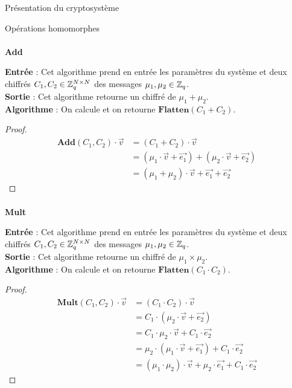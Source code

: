 \begin{section}{Présentation du cryptosystème}
\begin{subsection}{Opérations homomorphes}
	\paragraph{}
	\textbf{Add}
	\flushleft
	
	\textbf{Entrée} : Cet algorithme prend en entrée les paramètres du système et deux chiffrés $C_1, C_2 \in \mathbb{Z}_q^{N \times N}$ des messages $\mu_1, \mu_2 \in \mathbb{Z}_q$.\\
	\textbf{Sortie} : Cet algorithme retourne un chiffré de $\mu_1 + \mu_2$.\\
	\textbf{Algorithme} : On calcule et on retourne $\textbf{Flatten}(C_1 + C_2)$.
	\begin{proof}
	\begin{align*}
	\textbf{Add}(C_1, C_2) \cdot \vec{v} &= (C_1 + C_2) \cdot \vec{v} \\
	&= (\mu_1 \cdot \vec{v} + \vec{e_1}) + (\mu_2 \cdot \vec{v} + \vec{e_2}) \\
	&= (\mu_1 + \mu_2) \cdot \vec{v} + \vec{e_1} + \vec{e_2}
	\end{align*}
	\end{proof}
	
	\paragraph{}
	\textbf{Mult}
	\flushleft
	
	\textbf{Entrée} : Cet algorithme prend en entrée les paramètres du système et deux chiffrés $C_1, C_2 \in \mathbb{Z}_q^{N \times N}$ des messages $\mu_1, \mu_2 \in \mathbb{Z}_q$.\\
	\textbf{Sortie} : Cet algorithme retourne un chiffré de $\mu_1 \times \mu_2$. \\
	\textbf{Algorithme} : On calcule et on retourne $\textbf{Flatten}(C_1 \cdot C_2)$.
	\begin{proof}
	\begin{align*}
	\textbf{Mult}(C_1, C_2) \cdot \vec{v} &= (C_1 \cdot C_2) \cdot \vec{v} \\
	&= C_1 \cdot (\mu_2 \cdot \vec{v} + \vec{e_2}) \\
	&= C_1 \cdot \mu_2 \cdot \vec{v} + C_1 \cdot \vec{e_2} \\
	&= \mu_2 \cdot (\mu_1 \cdot \vec{v} + \vec{e_1}) + C_1 \cdot \vec{e_2} \\
	&= (\mu_1 \cdot \mu_2) \cdot \vec{v} + \mu_2 \cdot \vec{e_1} + C_1 \cdot \vec{e_2}
	\end{align*}
	\end{proof}
	

\end{subsection}
\end{section}
